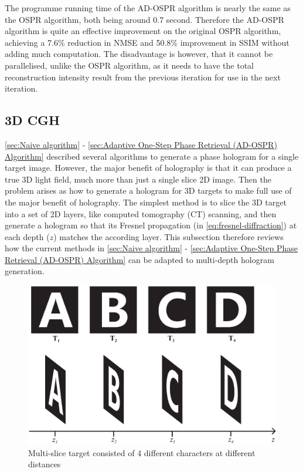 The programme running time of the AD-OSPR algorithm is nearly the same as the OSPR algorithm, both being around 0.7 second. Therefore the AD-OSPR algorithm is quite an effective improvement on the original OSPR algorithm, achieving a 7.6\% reduction in NMSE and 50.8\% improvement in SSIM without adding much computation. The disadvantage is however, that it cannot be parallelised, unlike the OSPR algorithm, as it needs to have the total reconstruction intensity result from the previous iteration for use in the next iteration.


\newpage
\subsection{3D CGH} \label{sec:3D CGH}
\cref{sec:Naive algorithm} - \cref{sec:Adaptive One-Step Phase Retrieval (AD-OSPR) Algorithm} described several algorithms to generate a phase hologram for a single target image. However, the major benefit of holography is that it can produce a true 3D light field, much more than just a single slice 2D image. Then the problem arises as how to generate a hologram for 3D targets to make full use of the major benefit of holography. The simplest method is to slice the 3D target into a set of 2D layers, like computed tomography (CT) scanning, and then generate a hologram so that its Fresnel propagation (in \cref{eq:fresnel-diffraction}) at each depth ($z$) matches the according layer. This subsection therefore reviews how the current methods in \cref{sec:Naive algorithm} - \cref{sec:Adaptive One-Step Phase Retrieval (AD-OSPR) Algorithm} can be adapted to multi-depth hologram generation.

\begin{figure}[H]
	\centering
	\includegraphics[width=1.0\textwidth]{ABCD/ABCD_target.eps}
	\caption{Multi-slice target consisted of 4 different characters at different distances}
	\label{fig:ABCD_target}
\end{figure}

